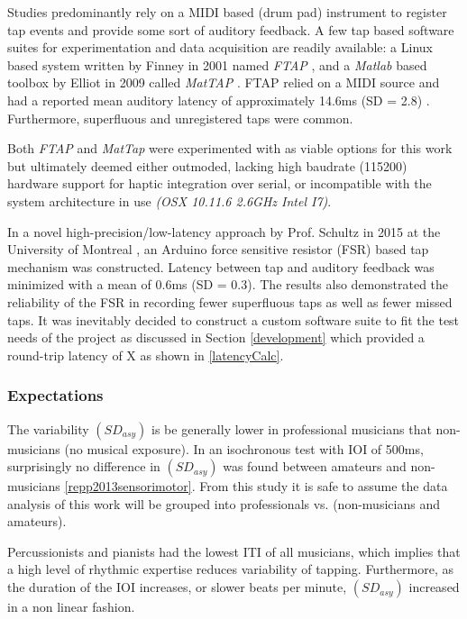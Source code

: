 Studies predominantly rely on a MIDI based (drum pad) instrument to register tap events and provide some sort of auditory feedback. A few tap based software suites for experimentation and data acquisition are readily available: a Linux based system written by Finney in 2001 named \textit{FTAP} \cite{finney2001ftap}, and a \textit{Matlab} based toolbox by Elliot in 2009 called \textit{MatTAP} \cite{elliott2009mattap}. FTAP relied on a MIDI source and had a reported mean auditory latency of approximately 14.6ms (SD = 2.8) \cite{schultz2016tap}. Furthermore, superfluous and unregistered taps were common.

Both \textit{FTAP} and \textit{MatTap} were experimented with as viable options for this work but ultimately deemed either outmoded, lacking high baudrate (115200) hardware support for haptic integration over serial, or incompatible with the system architecture in use \textit{(OSX 10.11.6 2.6GHz Intel I7)}.

In a novel high-precision/low-latency approach by Prof. Schultz in 2015 at the University of Montreal \cite{schultz2016tap}, an Arduino force sensitive resistor (FSR) based tap mechanism was constructed. Latency between tap and auditory feedback was minimized with a mean of 0.6ms (SD = 0.3). The results also demonstrated the reliability of the FSR in recording fewer superfluous taps as well as fewer missed taps.
It was inevitably decided to construct a custom software suite to fit the test needs of the project as discussed in Section \ref{development} which provided a round-trip latency of X as shown in \ref{latencyCalc}.

\subsubsection{Expectations} \label{SMSFindings}
The variability $(SD_{asy})$ is be generally lower in professional musicians that non-musicians (no musical exposure). In an isochronous test with IOI of 500ms, surprisingly no difference in $(SD_{asy})$ was found between amateurs and non-musicians \ref{repp2013sensorimotor}. From this study it is safe to assume the data analysis of this work will be grouped into professionals vs. (non-musicians and amateurs).

Percussionists and pianists had the lowest ITI of all musicians, which implies that a high level of rhythmic expertise reduces variability of tapping. Furthermore, as the duration of the IOI increases, or slower beats per minute, $(SD_{asy})$ increased in a non linear fashion. 

